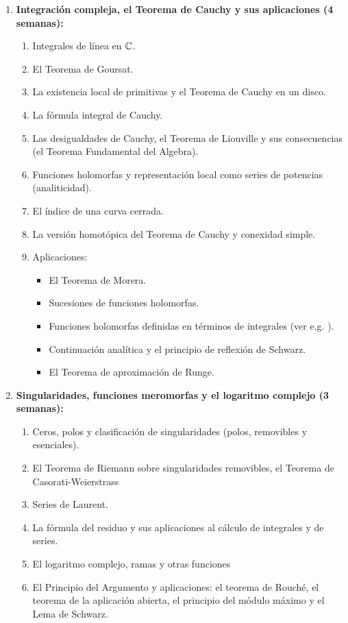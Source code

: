 \begin{refsection}
\begin{enumerate}
\item \textbf{Integración compleja, el Teorema de Cauchy y sus aplicaciones (4 semanas):} 
\begin{enumerate}
    \item Integrales de línea en $\mathbb{C}$.
    \item El Teorema de Goursat.
    \item La existencia local de primitivas y el Teorema de Cauchy en un disco.
    \item La fórmula integral de Cauchy.
    \item Las desigualdades de Cauchy, el Teorema de Liouville y sus consecuencias (el Teorema Fundamental del Algebra).
    \item Funciones holomorfas y representación local como series de potencias (analiticidad).
    \item El índice de una curva cerrada.
    \item La versión homotópica del Teorema de Cauchy y conexidad simple.
    \item Aplicaciones:
    \begin{itemize}
        \item El Teorema de Morera.
        \item Sucesiones de funciones holomorfas.
        \item Funciones holomorfas definidas en términos de integrales (ver e.g. \cite[\S 5.3]{Con78}).
        \item Continuación analítica y el principio de reflexión de Schwarz.
        \item El Teorema de aproximación de Runge.
    \end{itemize}
\end{enumerate}

\item \textbf{Singularidades, funciones meromorfas y el logaritmo complejo (3 semanas):} 
\begin{enumerate}
    \item Ceros, polos y clasificación de singularidades (polos, removibles y esenciales).
    \item El Teorema de Riemann  sobre singularidades removibles, el Teorema de Casorati-Weierstrass
    \item Series de Laurent.
    \item La fórmula del residuo y sus aplicaciones al cálculo de integrales y de series.
    \item El logaritmo complejo, ramas y otras funciones 
    \item El Principio del Argumento y aplicaciones: el teorema de Rouché, el teorema de la aplicación abierta, el principio del módulo máximo y el Lema de Schwarz.
\end{enumerate}


\end{enumerate}
\end{refsection}
